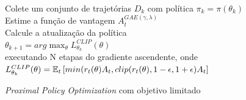 \medskip
\begin{center}
\begin{minipage}{0.92\textwidth}
\begin{algorithm2e}[H]
 \DontPrintSemicolon
   {Colete um conjunto de trajetórias $D_k$ com política $\pi_k = \pi(\theta_{k})$ \\
    Estime a função de vantagem $A_{t}^{GAE(\gamma, \lambda)}$ \\
    Calcule a atualização da política \\
    \hspace{3cm}$\theta_{k+1} = arg \max_{\theta}L^{CLIP}_{\theta_k}(\theta)$ \\
    executando N etapas do gradiente ascendente, onde \\
    \hspace{2cm}$L^{CLIP}_{\theta_k}(\theta) = \operatorname{\mathbb{E}}_{t} \left[min(r_{t}(\theta)A_{ t}, clip(r_{t}(\theta), 1-\epsilon, 1+\epsilon)A_{t}\right]$ 
   }
\caption{\textit{Proximal Policy Optimization} com objetivo limitado \label{alg:ppoclip}}
\end{algorithm2e}
\end{minipage}
\end{center}
